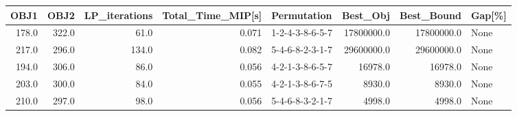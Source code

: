 \begin{tabular}{rrrrlrrl}
\toprule
  OBJ1 &   OBJ2 &  LP\_iterations &  Total\_Time\_MIP[s] &      Permutation &    Best\_Obj &  Best\_Bound & Gap[\%] \\
\midrule
 178.0 &  322.0 &           61.0 &              0.071 &  1-2-4-3-8-6-5-7 &  17800000.0 &  17800000.0 &   None \\
 217.0 &  296.0 &          134.0 &              0.082 &  5-4-6-8-2-3-1-7 &  29600000.0 &  29600000.0 &   None \\
 194.0 &  306.0 &           86.0 &              0.056 &  4-2-1-3-8-6-5-7 &     16978.0 &     16978.0 &   None \\
 203.0 &  300.0 &           84.0 &              0.055 &  4-2-1-3-8-6-7-5 &      8930.0 &      8930.0 &   None \\
 210.0 &  297.0 &           98.0 &              0.056 &  5-4-6-8-3-2-1-7 &      4998.0 &      4998.0 &   None \\
\bottomrule
\end{tabular}
